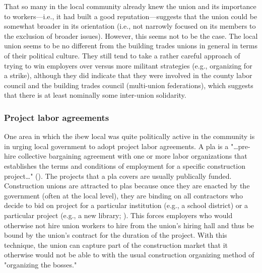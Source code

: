 \documentclass[12pt]{article}
\begin{document}
That so many in the local community already knew the union and its importance to workers---i.e., it had built a good reputation---suggests that the union could be somewhat broader in its orientation (i.e., not narrowly focused on its members to the exclusion of broader issues). However, this seems not to be the case. The local union seems to be no different from the building trades unions in general in terms of their political culture. They still tend to take a rather careful approach of trying to win employers over versus more militant strategies (e.g., organizing for a strike), although they did indicate that they were involved in the county labor council and the building trades council (multi-union federations), which suggests that there is at least nominally some inter-union solidarity.

\subsubsection{Project labor agreements}

One area in which the \acrshort{ibew} local was quite politically active in the community is in urging local government to adopt project labor agreements. A \acrfull{pla} is a "\ldots{}pre-hire collective bargaining agreement with one or more labor organizations that establishes the terms and conditions of employment for a specific construction project\ldots{}" (\cite{obamaExecutiveOrder135022009}). The projects that a \acrshort{pla} covers are usually publically funded. Construction unions are attracted to \acrshort{pla}s because once they are enacted by the government (often at the local level), they are binding on all contractors who decide to bid on project for a particular institution (e.g., a school district) or a particular project (e.g., a new library; \cite{kotlerProjectLaborAgreements2009, johnston-doddsConstructingCaliforniaReview2001}). This forces employers who would otherwise not hire union workers to hire from the union's hiring hall and thus be bound by the union's contract for the duration of the project. With this technique, the union can capture part of the construction market that it otherwise would not be able to with the usual construction organizing method of "organizing the bosses."
\end{document}
